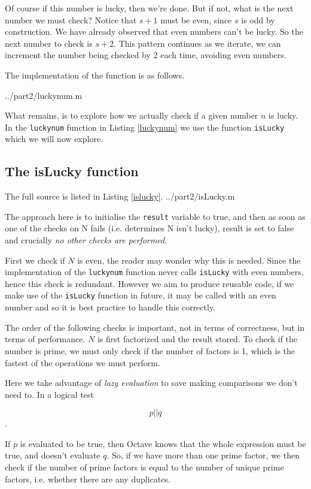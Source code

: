 \documentclass[10pt]{article}
\begin{document}
Of course if this number is lucky, then we're done. But if not, what is the next number we must check? Notice that $s + 1$ must be even, since $s$ is odd by construction. We have already observed that even numbers can't be lucky. So the next number to check is $s+2$. This pattern continues as we iterate, we can increment the number being checked by 2 each time, avoiding even numbers.

The implementation of the function is as follows. 

   {../part2/luckynum.m}

What remains, is to explore how we actually check if a given number $n$ is lucky. In the \texttt{luckynum} function in Listing \ref{luckynum} we use the function \texttt{isLucky} which we will now explore.

  
\subsection{The isLucky function}

The full source is listed in Listing \ref{islucky}.
   {../part2/isLucky.m}
  
The approach here is to initialise the \texttt{result} variable to true, and then as soon as one of the checks on N fails (i.e. determines N isn't lucky), result is set to false and crucially \emph{no other checks are performed}. 

First we check if $N$ is even, the reader may wonder why this is needed. Since the implementation of the \texttt{luckynum} function never calls \texttt{isLucky} with even numbers, hence this check is redundant. However we aim to produce reusable code, if we make use of the \texttt{isLucky} function in future, it may be called with an even number and so it is best practice to handle this correctly.

The order of the following checks is important, not in terms of correctness, but in terms of performance. $N$ is first factorized and the result stored. To check if the number is prime, we must only check if the number of factors is 1, which is the fastest of the operations we must perform.

Here we take advantage of \emph{lazy evaluation} to save making comparisons we don't need to. In a logical test

$$ p || q $$.

If $p$ is evaluated to be true, then Octave knows that the whole expression must be true, and doesn't evaluate $q$. So, if we have more than one prime factor, we then check if the number of prime factors is equal to the number of unique prime factors, i.e. whether there are any duplicates.
\end{document}
